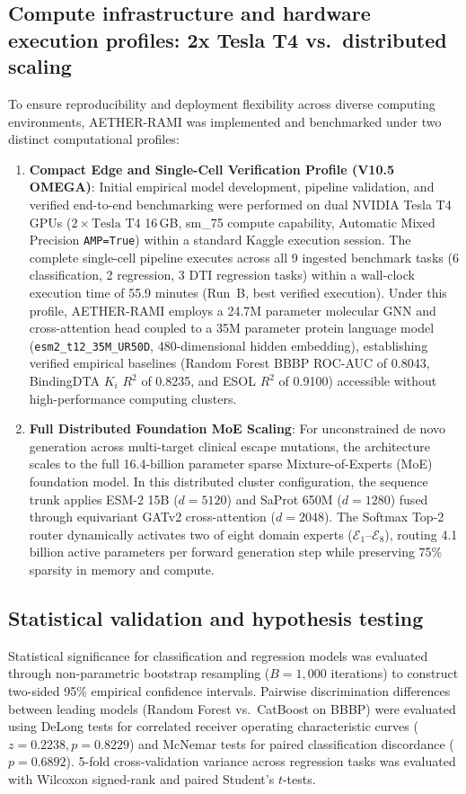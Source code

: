 \documentclass[11pt,a4paper]{article}
\begin{document}
\subsection*{Compute infrastructure and hardware execution profiles: 2x Tesla T4 vs.\ distributed scaling}
To ensure reproducibility and deployment flexibility across diverse computing environments, AETHER-RAMI was implemented and benchmarked under two distinct computational profiles:
\begin{enumerate}
    \item \textbf{Compact Edge and Single-Cell Verification Profile (V10.5 OMEGA)}: Initial empirical model development, pipeline validation, and verified end-to-end benchmarking were performed on dual NVIDIA Tesla T4 GPUs ($2 \times \text{Tesla T4}$ 16\,GB, sm\_75 compute capability, Automatic Mixed Precision \texttt{AMP=True}) within a standard Kaggle execution session. The complete single-cell pipeline executes across all 9 ingested benchmark tasks (6 classification, 2 regression, 3 DTI regression tasks) within a wall-clock execution time of 55.9 minutes (Run~B, best verified execution). Under this profile, AETHER-RAMI employs a 24.7M parameter molecular GNN and cross-attention head coupled to a 35M parameter protein language model (\texttt{esm2\_t12\_35M\_UR50D}, 480-dimensional hidden embedding), establishing verified empirical baselines (Random Forest BBBP ROC-AUC of 0.8043, BindingDTA $K_i$ $R^2$ of 0.8235, and ESOL $R^2$ of 0.9100) accessible without high-performance computing clusters.
    \item \textbf{Full Distributed Foundation MoE Scaling}: For unconstrained de novo generation across multi-target clinical escape mutations, the architecture scales to the full 16.4-billion parameter sparse Mixture-of-Experts (MoE) foundation model. In this distributed cluster configuration, the sequence trunk applies ESM-2 15B ($d = 5120$) and SaProt 650M ($d = 1280$) fused through equivariant GATv2 cross-attention ($d = 2048$). The Softmax Top-2 router dynamically activates two of eight domain experts ($\mathcal{E}_1$--$\mathcal{E}_8$), routing 4.1 billion active parameters per forward generation step while preserving 75\% sparsity in memory and compute.
\end{enumerate}

\subsection*{Statistical validation and hypothesis testing}
Statistical significance for classification and regression models was evaluated through non-parametric bootstrap resampling ($B = 1,000$ iterations) to construct two-sided 95\% empirical confidence intervals. Pairwise discrimination differences between leading models (Random Forest vs.\ CatBoost on BBBP) were evaluated using DeLong tests for correlated receiver operating characteristic curves ($z = 0.2238, p = 0.8229$) and McNemar tests for paired classification discordance ($p = 0.6892$). 5-fold cross-validation variance across regression tasks was evaluated with Wilcoxon signed-rank and paired Student's $t$-tests.
\end{document}
